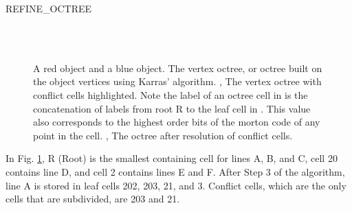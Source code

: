 \documentclass{egpubl}
\begin{document}
\algorithmspace
\begin{algorithm}
  \DontPrintSemicolon
  \LinesNumbered
  \BlankLine
\caption{REFINE\_OCTREE}
\label{alg:refine-octree}
\end{algorithm}
\algorithmspace

\begin{figure}
  \centering
   \\
   \\
  \caption{
    \protect{} A red object and a blue object.
    \protect{} The vertex octree, or octree built on the object vertices using Karras' algorithm.
    \protect{}, \protect{} The vertex octree with conflict cells highlighted. Note the label of an octree cell in \protect{} is the concatenation of labels from root R to the leaf cell in \protect{}. This value also corresponds to the highest order bits of the morton code of any point in the cell.
    \protect{}, \protect{} The octree after resolution of conflict cells.
  }
  \label{fig:steps}
\end{figure}

In Fig. \ref{fig:steps}, R (Root) is the smallest containing cell for lines A, B, and C, cell 20 contains line D, and cell 2 contains lines E and F. After Step 3 of the algorithm, line A is stored in leaf cells 202, 203, 21, and 3. Conflict cells, which are the only cells that are subdivided, are 203 and 21.
\end{document}
